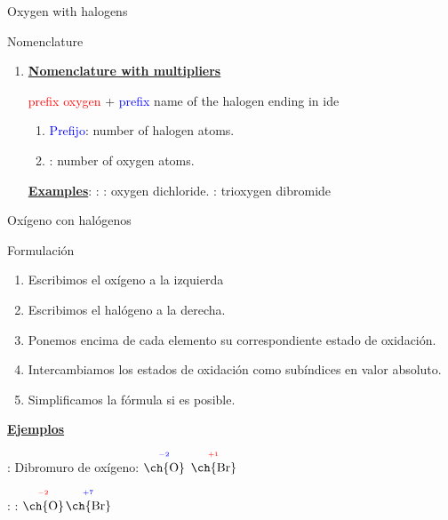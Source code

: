 \documentclass{beamer}
\newcommand{\eob}[2]{$\overset{^{\color{blue}#1}}{\text{\ch{#2}}}$}
\newcommand{\eor}[2]{$\overset{^{\color{red}#1}}{\text{\ch{#2}}}$}
\begin{document}
\begin{frame}[t]{ Oxygen with halogens}\vspace{10pt}
    
    \begin{alertblock}{\Large Nomenclature}
        \begin{enumerate}[label=\itembolascolor{\arabic*}{mDarkTeal}]
            \item \textbf{\uline{Nomenclature with multipliers}}
                  \begin{center}
                      \textcolor{red}{prefix} \textcolor{red}{oxygen} + \textcolor{blue}{prefix}  \textcolor{azulF}{name of the halogen ending in}  \textcolor{green!50!black}{ide}   
                  \end{center}

                  \begin{enumerate}[label=\textcolor{red}{$\bullet$}]
                      \item \textcolor{blue}{Prefijo}: number of halogen atoms.
                      \item {}: number of oxygen atoms.
                  \end{enumerate}

                  \textbf{\uline{Examples}}:  : : oxygen dichloride.
                   :  trioxygen dibromide
        \end{enumerate}
    \end{alertblock}
\end{frame}




\begin{frame}[t]{Oxígeno con halógenos}
    \begin{exampleblock}{\Large Formulación}\vspace*{5pt}
        \begin{enumerate}[label=\itembolascolor{\arabic*}{mDarkTeal}]
            \item Escribimos el oxígeno a la izquierda
            \item Escribimos el halógeno a la derecha.
            \item Ponemos encima de cada elemento su correspondiente estado de oxidación.
            \item Intercambiamos los estados de oxidación como subíndices en valor absoluto.
            \item Simplificamos la fórmula si es posible.
        \end{enumerate}
    \end{exampleblock}
    \textbf{\uline{Ejemplos}}

     : Dibromuro de oxígeno: \eob{-2}{O} \eor{+1}{Br}  

     : : \eor{-2}{O}\eob{+7}{Br} 
\end{frame}
\end{document}
